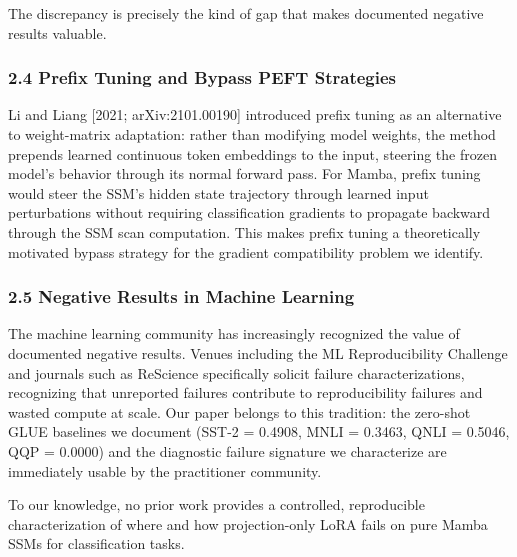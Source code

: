 The discrepancy is precisely the kind of gap that makes documented negative results valuable.

\subsubsection{2.4 Prefix Tuning and Bypass PEFT Strategies}

Li and Liang [2021; arXiv:2101.00190] introduced prefix tuning as an alternative to weight-matrix adaptation: rather than modifying model weights, the method prepends learned continuous token embeddings to the input, steering the frozen model's behavior through its normal forward pass. For Mamba, prefix tuning would steer the SSM's hidden state trajectory through learned input perturbations without requiring classification gradients to propagate backward through the SSM scan computation. This makes prefix tuning a theoretically motivated bypass strategy for the gradient compatibility problem we identify.

\subsubsection{2.5 Negative Results in Machine Learning}

The machine learning community has increasingly recognized the value of documented negative results. Venues including the ML Reproducibility Challenge \citep{Sinha2021} and journals such as ReScience specifically solicit failure characterizations, recognizing that unreported failures contribute to reproducibility failures and wasted compute at scale. Our paper belongs to this tradition: the zero-shot GLUE baselines we document (SST-2 = 0.4908, MNLI = 0.3463, QNLI = 0.5046, QQP = 0.0000) and the diagnostic failure signature we characterize are immediately usable by the practitioner community.

To our knowledge, no prior work provides a controlled, reproducible characterization of where and how projection-only LoRA fails on pure Mamba SSMs for classification tasks.

